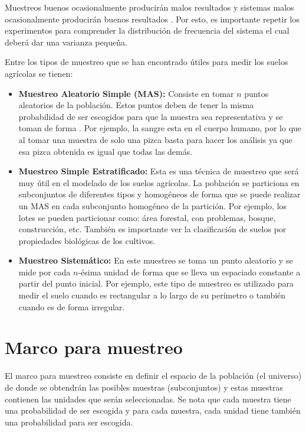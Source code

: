 \documentclass{report}
\begin{document}
\bigbreak

Muestreos buenos ocasionalmente producirán malos resultados y sistemas malos ocasionalmente producirán buenos resultados \cite{gulland-1966}. Por esto, es importante repetir los experimentos para comprender la distribución de frecuencia del sistema el cual deberá dar una varianza pequeña.

\bigbreak

Entre los tipos de muestreo que se han encontrado útiles para medir los suelos agrícolas se tienen:

\begin{itemize}
    \item \textbf{Muestreo Aleatorio Simple (MAS):} Consiste en tomar $n$ puntos aleatorios de la población. Estos puntos deben de tener la misma probabilidad de ser escogidos para que la muestra sea representativa y se toman de forma . Por ejemplo, la sangre esta  en el cuerpo humano, por lo que al tomar una muestra de solo una pizca basta para hacer los análisis ya que esa pizca obtenida es igual que todas las demás.
    
    \item \textbf{Muestreo Simple Estratificado:} Esta es una técnica de muestreo que será muy útil en el modelado de los suelos agrícolas. La población se particiona en subconjuntos de diferentes tipos y homogéneos de forma que se puede realizar un MAS en cada subconjunto homogéneo de la partición. Por ejemplo, los lotes se pueden particionar como: área forestal, con problemas, bosque, construcción, etc. También es importante ver la clasificación de suelos por propiedades biológicas de los cultivos.
    
    \item \textbf{Muestreo Sistemático:} En este muestreo se toma un punto aleatorio y se mide por cada $n$-ésima unidad de forma que se lleva un espaciado constante a partir del punto inicial. Por ejemplo, este tipo de muestreo es utilizado para medir el suelo cuando es rectangular a lo largo de su perímetro o también cuando es de forma irregular.
\end{itemize}

\section{Marco para muestreo}

El marco para muestreo \cite{lohr-2009} consiste en definir el espacio de la población (el universo) de donde se obtendrán las posibles muestras (subconjuntos) y estas muestras contienen las unidades que serán seleccionadas. Se nota que cada muestra tiene una probabilidad de ser escogida y para cada muestra, cada unidad tiene también una probabilidad para ser escogida.
\end{document}
